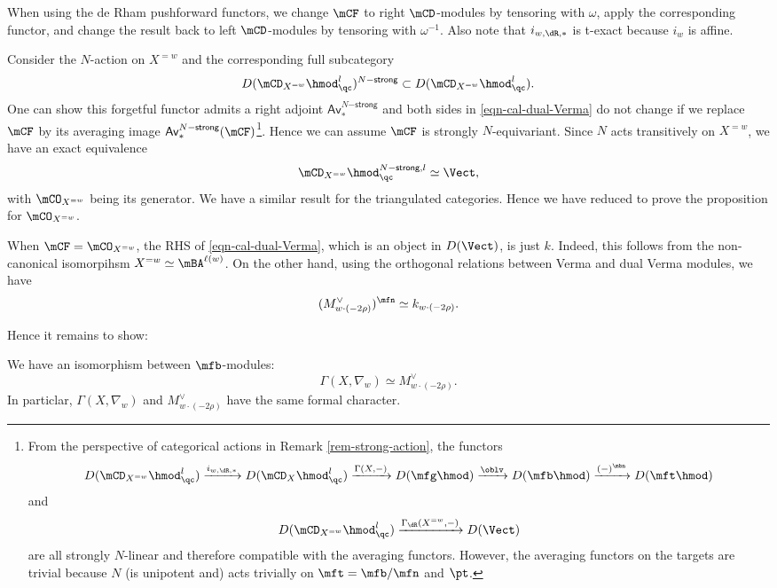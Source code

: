 	\begin{rem}
		When using the de Rham pushforward functors, we change $\mCF$ to right $\mCD$-modules by tensoring with $\omega$, apply the corresponding functor, and change the result back to left $\mCD$-modules by tensoring with $\omega^{-1}$. Also note that $i_{w,\dR,*}$ is t-exact because $i_w$ is affine.
	\end{rem}

	\proof[Sketch]
		Consider the $N$-action on $X^{=w}$ and the corresponding full subcategory 
		\[
			 D(\mCD_{X^{=w}}\hmod_\qc^l)^{N\mathsf{-strong}} \subset D(\mCD_{X^{=w}}\hmod_\qc^l).
		\]
		One can show this forgetful functor admits a right adjoint $\mathsf{Av}_*^{N\mathsf{-strong}}$ and both sides in \eqref{eqn-cal-dual-Verma} do not change if we replace $\mCF$ by its averaging image $\mathsf{Av}_*^{N\mathsf{-strong}}(\mCF)$\footnote{From the perspective of categorical actions in Remark \ref{rem-strong-action}, the functors
		\[
			D(\mCD_{X^{=w}}\hmod_\qc^l) \xrightarrow{ i_{w,\dR,*} } D(\mCD_X\hmod_\qc^l) \xrightarrow{ \Gamma(X,-) } D(\mfg\hmod) \xrightarrow{\oblv} D(\mfb\hmod) \xrightarrow{(-)^\mbn} D(\mft\hmod)
		\]
		and
		\[
			D(\mCD_{X^{=w}}\hmod_\qc^l) \xrightarrow{ \Gamma_\dR(X^{=w},-) } D(\Vect)
		\]
		are all strongly $N$-linear and therefore compatible with the averaging functors. However, the averaging functors on the targets are trivial because $N$ (is unipotent and) acts trivially on $\mft=\mfb/\mfn$ and $\pt$.}. Hence we can assume $\mCF$ is strongly $N$-equivariant. Since $N$ acts transitively on $X^{=w}$, we have an exact equivalence
		\[
			\mCD_{X^{=w}}\hmod_\qc^{N\mathsf{-strong},l} \simeq \Vect,
		\]
		with $\mCO_{X^{=w}}$ being its generator. We have a similar result for the triangulated categories. Hence we have reduced to prove the proposition for $\mCO_{X^{=w}}$. 

		When $\mCF=\mCO_{X^{=w}}$, the RHS of \eqref{eqn-cal-dual-Verma}, which is an object in $D(\Vect)$, is just $k$. Indeed, this follows from the non-canonical isomorpihsm $X^{=w}\simeq \mBA^{\ell(w)}$. On the other hand, using the orthogonal relations between Verma and dual Verma modules, we have
		\[
			(M_{w\cdot (-2\rho)}^\vee)^\mfn  \simeq k_{w\cdot (-2\rho)}.
		\]

		Hence it remains to show:

	\begin{prop}
		We have an isomorphism between $\mfb$-modules:
		\[
			\Gamma(X,\nabla_w) \simeq M_{w\cdot (-2\rho)}^\vee.
		\]
		In particlar, $\Gamma(X,\nabla_w)$ and $M_{w\cdot (-2\rho)}^\vee$ have the same formal character.
	\end{prop}

